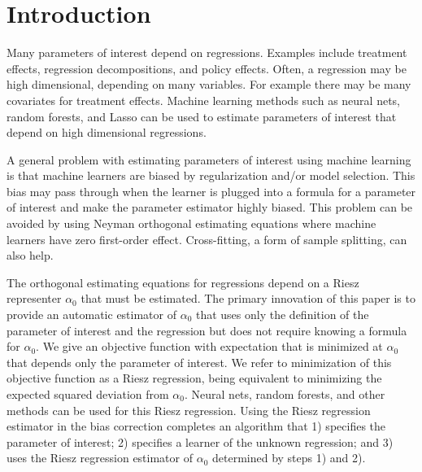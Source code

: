 \documentclass[aos]{imsart}
\numberwithin{equation}{section}
\theoremstyle{plain}
\theoremstyle{remark}
\begin{document}
\begin{frontmatter}
\begin{keyword}[class=MSC]
\end{keyword}

\begin{keyword}
\end{keyword}

\end{frontmatter}


\section{Introduction}
Many parameters of interest depend on regressions. 
Examples include treatment effects, regression decompositions, and policy effects. 
Often, a regression may be high dimensional, depending on many variables. 
For example there may be many covariates for treatment effects.   Machine learning methods such as neural nets, random forests, and Lasso can be used to estimate parameters of interest that depend on high dimensional regressions.

A general problem with estimating parameters of interest using machine learning is that machine learners are biased by regularization and/or model selection. 
This bias may pass through when the learner is plugged into a formula for a parameter of interest and make the parameter estimator highly biased. 
This problem can be avoided by using Neyman orthogonal estimating equations where machine learners have zero first-order effect. 
Cross-fitting, a form of sample splitting, can also help.

The orthogonal estimating equations for regressions depend on a Riesz representer  $\alpha_0$ that must be estimated. 
The primary innovation of this paper is to provide an automatic estimator of $\alpha_0$ that uses only the definition of the parameter of interest and the regression but does not require knowing a formula for  $\alpha_0$.  
We give an objective function with expectation that is minimized at $\alpha_0$ that depends only the parameter of interest. 
We refer to minimization of this objective function as a Riesz regression, being equivalent to minimizing the expected squared deviation from  $\alpha_0$. 
Neural nets, random forests, and other methods can be used for this Riesz regression. 
Using the Riesz regression estimator in the bias correction completes an algorithm that 1) specifies the parameter of interest;
2) specifies a learner of the unknown regression; and 3) uses the Riesz regression estimator of $\alpha_0$ determined by steps 1) and 2).
 
\end{document}
